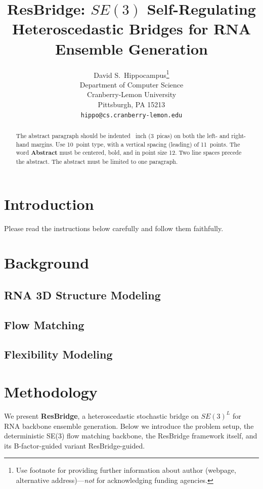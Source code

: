 \documentclass{article}
\title{ResBridge: $SE(3)$ Self-Regulating Heteroscedastic Bridges for RNA Ensemble Generation}
\author{%
  David S.~Hippocampus\thanks{Use footnote for providing further information
    about author (webpage, alternative address)---\emph{not} for acknowledging
    funding agencies.} \\
  Department of Computer Science\\
  Cranberry-Lemon University\\
  Pittsburgh, PA 15213 \\
  \texttt{hippo@cs.cranberry-lemon.edu} \\
}
\begin{document}
\maketitle


\begin{abstract}
  The abstract paragraph should be indented ~inch (3~picas) on both the left- and right-hand margins. Use 10~point type, with a vertical spacing (leading) of 11~points. The word \textbf{Abstract} must be centered, bold, and in point size 12. Two line spaces precede the abstract. The abstract must be limited to one paragraph.
\end{abstract}



\section{Introduction}


Please read the instructions below carefully and follow them faithfully.


\section{Background}

\subsection{RNA 3D Structure Modeling}

\subsection{Flow Matching}

\subsection{Flexibility Modeling}


\section{Methodology}


We present \textbf{ResBridge}, a heteroscedastic stochastic bridge on $SE(3)^L$ for RNA backbone ensemble generation. Below we introduce the problem setup, the deterministic SE(3) flow matching backbone, the ResBridge framework itself, and its B-factor-guided variant ResBridge-guided.
\end{document}
